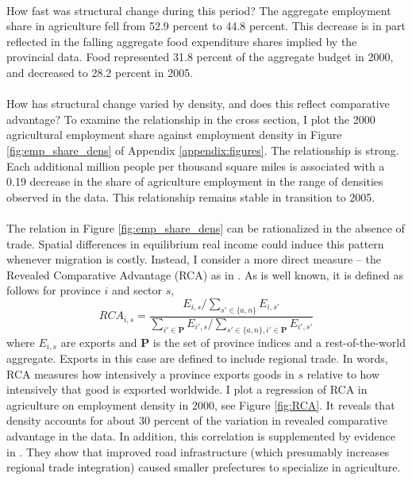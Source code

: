 \documentclass[]{article}
\theoremstyle{plain}
\begin{document}
\paragraph*{}
How fast was structural change during this period? The aggregate employment share in agriculture fell from 52.9 percent to 44.8 percent. This decrease is in part reflected in the falling aggregate food expenditure shares implied by the provincial data. Food represented 31.8 percent of the aggregate budget in 2000, and decreased to 28.2 percent in 2005. 
\paragraph*{}
How has structural change varied by density, and does this reflect comparative advantage? To examine the relationship in the cross section, I plot the 2000 agricultural employment share against employment density in Figure \ref{fig:emp_share_dens} of Appendix \ref{appendix:figures}. The relationship is strong. Each additional million people per thousand square miles is associated with a 0.19 decrease in the share of agriculture employment in the range of densities observed in the data. This relationship remains stable in transition to 2005.   
\paragraph*{}
The relation in Figure \ref{fig:emp_share_dens} can be rationalized in the absence of trade. Spatial differences in equilibrium real income could induce this pattern whenever migration is costly. Instead, I consider a more direct measure -- the Revealed Comparative Advantage (RCA) as in \cite{balassa}. As is well known, it is defined as follows for province $i$ and sector $s$, 
\begin{equation*}
	RCA_{i, s} = \frac{E_{i, s}/\sum_{s' \in \{a, n\}}E_{i, s'}}{\sum_{i' \in \mathbf{P}}E_{i', s}/\sum_{s' \in \{a, n\}, i' \in \mathbf{P}}E_{i', s'}}
\end{equation*} 
where $E_{i, s}$ are exports and $\mathbf{P}$ is the set of province indices and a rest-of-the-world aggregate. Exports in this case are defined to include regional trade. In words, RCA measures how intensively a province exports goods in $s$ relative to how intensively that good is exported worldwide. I plot a regression of RCA in agriculture on employment density in 2000, see Figure \ref{fig:RCA}. It reveals that density accounts for about 30 percent of the variation in revealed comparative advantage in the data. In addition, this correlation is supplemented by evidence in \cite{bsetal2020}. They show that improved road infrastructure (which presumably increases regional trade integration) caused smaller prefectures to specialize in agriculture.
\end{document}
